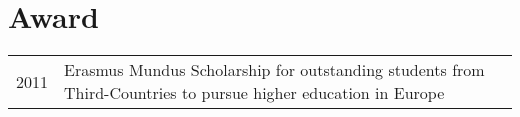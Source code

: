 \section{Award}
\begin{tabular}
	{r|p{13cm}} 
	\textsc{2011} & Erasmus Mundus Scholarship for outstanding students from Third-Countries to pursue higher education in Europe\\
\end{tabular}
